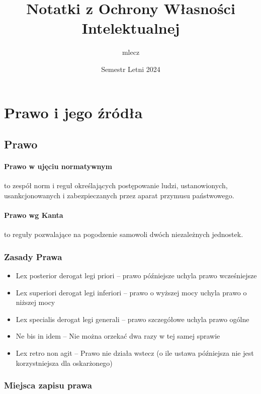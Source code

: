 \documentclass{article}
\title{Notatki z Ochrony Własności Intelektualnej}
\author{mlecz}
\date{Semestr Letni 2024}
\begin{document}
\maketitle
\tableofcontents

\section{Prawo i jego źródła}

\subsection{Prawo}

\paragraph{Prawo w ujęciu normatywnym}

to zespół norm i reguł określających postępowanie ludzi, ustanowionych, usankcjonowanych i zabezpieczanych przez aparat przymusu państwowego.

\paragraph{Prawo wg Kanta}

to reguły pozwalające na pogodzenie samowoli dwóch niezależnych jednostek.

\subsubsection{Zasady Prawa}

\begin{itemize}
  \item Lex posterior derogat legi priori -- prawo późniejsze uchyla prawo wcześniejsze
  \item Lex superiori derogat legi inferiori -- prawo o wyższej mocy uchyla prawo o niższej mocy
  \item Lex specialis derogat legi generali -- prawo szczegółowe uchyla prawo ogólne
  \item Ne bis in idem -- Nie można orzekać dwa razy w tej samej sprawie
  \item Lex retro non agit -- Prawo nie działa wstecz (o ile ustawa późniejsza nie jest
        korzystniejsza dla oskarżonego)
\end{itemize}

\subsubsection{Miejsca zapisu prawa}
\end{document}
